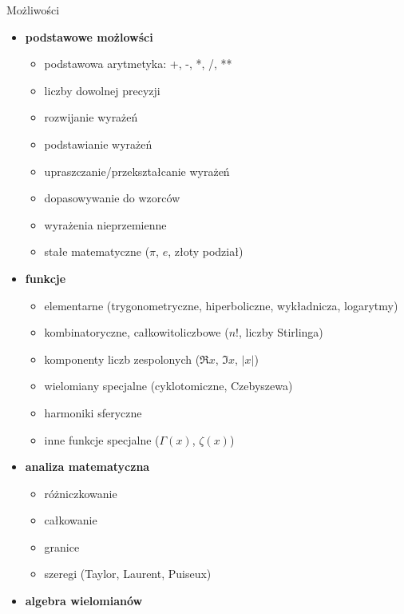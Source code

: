 \documentclass[10pt]{beamer}
\begin{document}
\begin{frame}{Możliwości}
  \begin{multicols}{2}
    \tiny
    \begin{itemize}
      \item \textbf{podstawowe możlowści}
        \begin{itemize}
          \tiny
          \item podstawowa arytmetyka: +, -, *, /, **
          \item liczby dowolnej precyzji
          \item rozwijanie wyrażeń
          \item podstawianie wyrażeń
          \item upraszczanie/przekształcanie wyrażeń
          \item dopasowywanie do wzorców
          \item wyrażenia nieprzemienne
          \item stałe matematyczne ($\pi$, $e$, złoty podział)
        \end{itemize}
      \item \textbf{funkcje}
        \begin{itemize}
          \tiny
          \item elementarne (trygonometryczne, hiperboliczne, wykładnicza, logarytmy)
          \item kombinatoryczne, całkowitoliczbowe ($n!$, liczby Stirlinga)
          \item komponenty liczb zespolonych ($\Re{x}$, $\Im{x}$, $\left|{x}\right|$)
          \item wielomiany specjalne (cyklotomiczne, Czebyszewa)
          \item harmoniki sferyczne
          \item inne funkcje specjalne ($\Gamma{\left(x \right)}$, $\zeta{\left(x \right)}$)
        \end{itemize}
      \item \textbf{analiza matematyczna}
        \begin{itemize}
          \tiny
          \item różniczkowanie
          \item całkowanie
          \item granice
          \item szeregi (Taylor, Laurent, Puiseux)
        \end{itemize}
      \item \textbf{algebra wielomianów}
        \begin{itemize}

\end{itemize}
\end{itemize}
\end{multicols}
\end{frame}
\end{document}
